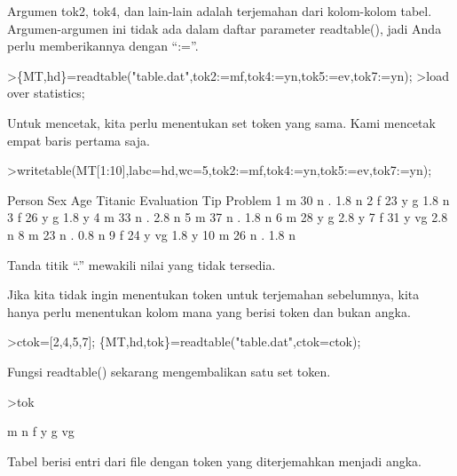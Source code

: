 \documentclass{article}
\begin{document}
\begin{eulernotebook}
\begin{eulercomment}
Argumen tok2, tok4, dan lain-lain adalah terjemahan dari kolom-kolom
tabel. Argumen-argumen ini tidak ada dalam daftar parameter
readtable(), jadi Anda perlu memberikannya dengan “:=”.
\end{eulercomment}
\begin{eulerprompt}
>\{MT,hd\}=readtable("table.dat",tok2:=mf,tok4:=yn,tok5:=ev,tok7:=yn);
>load over statistics;
\end{eulerprompt}
\begin{eulercomment}
Untuk mencetak, kita perlu menentukan set token yang sama. Kami
mencetak empat baris pertama saja.
\end{eulercomment}
\begin{eulerprompt}
>writetable(MT[1:10],labc=hd,wc=5,tok2:=mf,tok4:=yn,tok5:=ev,tok7:=yn);
\end{eulerprompt}
\begin{euleroutput}
   Person  Sex  Age Titanic Evaluation  Tip Problem
        1    m   30       n          .  1.8       n
        2    f   23       y          g  1.8       n
        3    f   26       y          g  1.8       y
        4    m   33       n          .  2.8       n
        5    m   37       n          .  1.8       n
        6    m   28       y          g  2.8       y
        7    f   31       y         vg  2.8       n
        8    m   23       n          .  0.8       n
        9    f   24       y         vg  1.8       y
       10    m   26       n          .  1.8       n
\end{euleroutput}
\begin{eulercomment}
Tanda titik “.” mewakili nilai yang tidak tersedia.


Jika kita tidak ingin menentukan token untuk terjemahan sebelumnya,
kita hanya perlu menentukan kolom mana yang berisi token dan bukan
angka.
\end{eulercomment}
\begin{eulerprompt}
>ctok=[2,4,5,7]; \{MT,hd,tok\}=readtable("table.dat",ctok=ctok);
\end{eulerprompt}
\begin{eulercomment}
Fungsi readtable() sekarang mengembalikan satu set token.
\end{eulercomment}
\begin{eulerprompt}
>tok
\end{eulerprompt}
\begin{euleroutput}
  m
  n
  f
  y
  g
  vg
\end{euleroutput}
\begin{eulercomment}
Tabel berisi entri dari file dengan token yang diterjemahkan menjadi
angka.



\end{eulercomment}
\end{eulernotebook}
\end{document}

